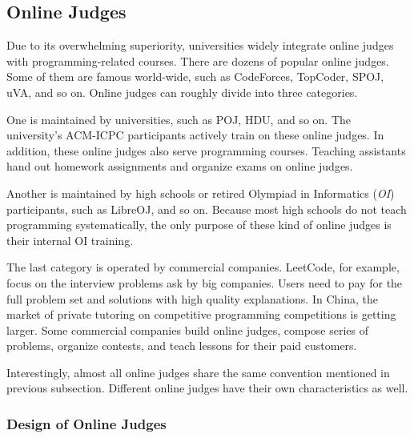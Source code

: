     \subsection{Online Judges}

        Due to its overwhelming superiority, universities widely
        integrate online judges with programming-related courses.
        There are dozens of popular online judges.
        Some of them are famous world-wide, such as CodeForces, TopCoder, SPOJ, uVA, and so on. %
        Online judges can roughly divide into three categories.

        One is maintained by universities, such as POJ, HDU, and so on. %
        The university's ACM-ICPC participants actively train on these online judges.
        In addition, these online judges also serve programming courses.
        Teaching assistants hand out homework assignments and organize exams on online judges.

        Another is maintained by high schools
        or retired Olympiad in Informatics (\emph{OI}) participants,
        such as LibreOJ, and so on. %
        Because most high schools do not teach programming systematically,
        the only purpose of these kind of online judges is their internal OI training.

        The last category is operated by commercial companies. %
        LeetCode, for example, focus on the interview problems ask by big companies.
        Users need to pay for the full problem set and solutions with high quality explanations.
        In China, the market of private tutoring on competitive programming competitions is getting larger.
        Some commercial companies build online judges, compose series of problems, organize contests,
        and teach lessons for their paid customers.

        Interestingly, almost all online judges share the same convention mentioned in previous subsection.
        Different online judges have their own characteristics as well.

        \subsubsection{Design of Online Judges}

